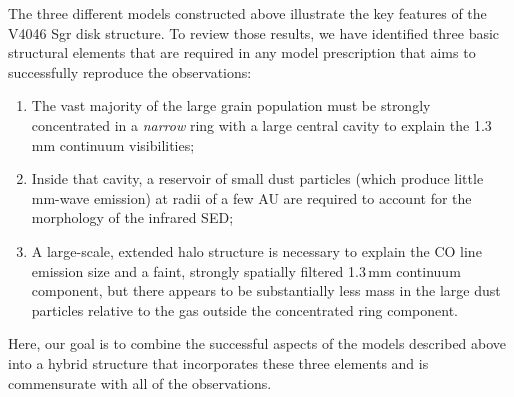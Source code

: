 {The three different models constructed above illustrate the key features of the 
V4046 Sgr disk structure.  To review those results, we have identified three 
basic structural elements that are required in any model prescription that aims 
to successfully reproduce the observations:
\begin{enumerate}
\item The vast majority of the large grain population must be strongly
concentrated in a {\it narrow} ring with a large central cavity to explain the
1.3\,mm continuum visibilities;
\item Inside that cavity, a reservoir of small dust particles (which produce
little mm-wave emission) at radii of a few AU are required to account for the
morphology of the infrared SED;
\item A large-scale, extended halo structure is necessary to explain the CO
line emission size and a faint, strongly spatially filtered 1.3\,mm continuum 
component, but there appears
to be substantially less mass in the large dust particles relative to the gas
outside the concentrated ring component.
\end{enumerate}
Here, our goal is to combine the successful aspects of the models described
above into a hybrid structure that incorporates these three elements and is
commensurate with all of the observations.

}
